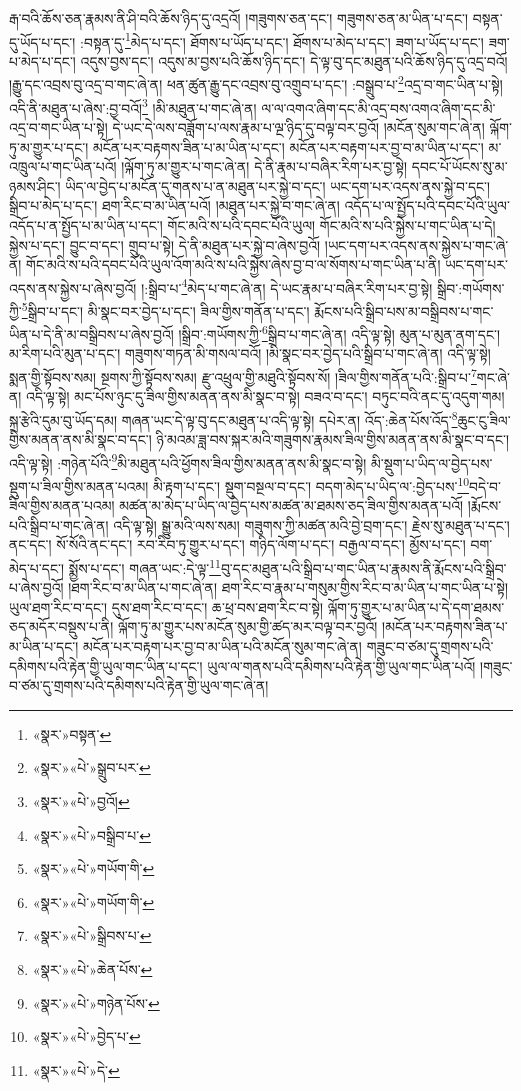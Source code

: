རྒ་བའི་ཆོས་ཅན་རྣམས་ནི་ཤི་བའི་ཆོས་ཉིད་དུ་འདྲའོ། །གཟུགས་ཅན་དང་། གཟུགས་ཅན་མ་ཡིན་པ་དང་། བསྟན་དུ་ཡོད་པ་དང་། :བསྟན་དུ་\footnote{«སྣར་»བསྟན་}མེད་པ་དང་། ཐོགས་པ་ཡོད་པ་དང་། ཐོགས་པ་མེད་པ་དང་། ཟག་པ་ཡོད་པ་དང་། ཟག་པ་མེད་པ་དང་། འདུས་བྱས་དང་། འདུས་མ་བྱས་པའི་ཆོས་ཉིད་དང་། དེ་ལྟ་བུ་དང་མཐུན་པའི་ཆོས་ཉིད་དུ་འདྲ་བའོ། །རྒྱུ་དང་འབྲས་བུ་འདྲ་བ་གང་ཞེ་ན། ཕན་ཚུན་རྒྱུ་དང་འབྲས་བུ་འགྲུབ་པ་དང་། :བསྒྲུབ་པ་\footnote{«སྣར་»«པེ་»སྒྲུབ་པར་}འདྲ་བ་གང་ཡིན་པ་སྟེ། འདི་ནི་མཐུན་པ་ཞེས་:བྱ་བའོ།\footnote{«སྣར་»«པེ་»བྱའོ།} །མི་མཐུན་པ་གང་ཞེ་ན། ལ་ལ་འགའ་ཞིག་དང་མི་འདྲ་བས་འགའ་ཞིག་དང་མི་འདྲ་བ་གང་ཡིན་པ་སྟེ། དེ་ཡང་དེ་ལས་བཟློག་པ་ལས་རྣམ་པ་ལྔ་ཉིད་དུ་བལྟ་བར་བྱའོ། །མངོན་སུམ་གང་ཞེ་ན། ལྐོག་ཏུ་མ་གྱུར་པ་དང་། མངོན་པར་བརྟགས་ཟིན་པ་མ་ཡིན་པ་དང་། མངོན་པར་བརྟག་པར་བྱ་བ་མ་ཡིན་པ་དང་། མ་འཁྲུལ་པ་གང་ཡིན་པའོ། །ལྐོག་ཏུ་མ་གྱུར་པ་གང་ཞེ་ན། དེ་ནི་རྣམ་པ་བཞིར་རིག་པར་བྱ་སྟེ། དབང་པོ་ཡོངས་སུ་མ་ཉམས་ཤིང་། ཡིད་ལ་བྱེད་པ་མངོན་དུ་གནས་པ་ན་མཐུན་པར་སྐྱེ་བ་དང་། ཡང་དག་པར་འདས་ནས་སྐྱེ་བ་དང་། སྒྲིབ་པ་མེད་པ་དང་། ཐག་རིང་བ་མ་ཡིན་པའོ། །མཐུན་པར་སྐྱེ་བ་གང་ཞེ་ན། འདོད་པ་ལ་སྤྱོད་པའི་དབང་པོའི་ཡུལ་འདོད་པ་ན་སྤྱོད་པ་མ་ཡིན་པ་དང་། གོང་མའི་ས་པའི་དབང་པོའི་ཡུལ། གོང་མའི་ས་པའི་སྐྱེས་པ་གང་ཡིན་པ་དེ། སྐྱེས་པ་དང་། བྱུང་བ་དང་། གྲུབ་པ་སྟེ། དེ་ནི་མཐུན་པར་སྐྱེ་བ་ཞེས་བྱའོ། །ཡང་དག་པར་འདས་ནས་སྐྱེས་པ་གང་ཞེ་ན། གོང་མའི་ས་པའི་དབང་པོའི་ཡུལ་འོག་མའི་ས་པའི་སྐྱེས་ཞེས་བྱ་བ་ལ་སོགས་པ་གང་ཡིན་པ་ནི། ཡང་དག་པར་འདས་ནས་སྐྱེས་པ་ཞེས་བྱའོ། །:སྒྲིབ་པ་\footnote{«སྣར་»«པེ་»བསྒྲིབ་པ་}མེད་པ་གང་ཞེ་ན། དེ་ཡང་རྣམ་པ་བཞིར་རིག་པར་བྱ་སྟེ། སྒྲིབ་:གཡོགས་ཀྱི་\footnote{«སྣར་»«པེ་»གཡོག་གི་}སྒྲིབ་པ་དང་། མི་སྣང་བར་བྱེད་པ་དང་། ཟིལ་གྱིས་གནོན་པ་དང་། རྨོངས་པའི་སྒྲིབ་པས་མ་བསྒྲིབས་པ་གང་ཡིན་པ་དེ་ནི་མ་བསྒྲིབས་པ་ཞེས་བྱའོ། །སྒྲིབ་:གཡོགས་ཀྱི་\footnote{«སྣར་»«པེ་»གཡོག་གི་}སྒྲིབ་པ་གང་ཞེ་ན། འདི་ལྟ་སྟེ། མུན་པ་མུན་ནག་དང་། མ་རིག་པའི་མུན་པ་དང་། གཟུགས་གཏན་མི་གསལ་བའོ། །མི་སྣང་བར་བྱེད་པའི་སྒྲིབ་པ་གང་ཞེ་ན། འདི་ལྟ་སྟེ། སྨན་གྱི་སྟོབས་སམ། སྔགས་ཀྱི་སྟོབས་སམ། རྫུ་འཕྲུལ་གྱི་མཐུའི་སྟོབས་སོ། །ཟིལ་གྱིས་གནོན་པའི་:སྒྲིབ་པ་\footnote{«སྣར་»«པེ་»སྒྲིབས་པ་}གང་ཞེ་ན། འདི་ལྟ་སྟེ། མང་པོས་ཉུང་དུ་ཟིལ་གྱིས་མནན་ནས་མི་སྣང་བ་སྟེ། བཟའ་བ་དང་། བཏུང་བའི་ནང་དུ་འདུག་གམ། སྐྲ་རྩེའི་དུམ་བུ་ཡོད་དམ། གཞན་ཡང་དེ་ལྟ་བུ་དང་མཐུན་པ་འདི་ལྟ་སྟེ། དཔེར་ན། འོད་:ཆེན་པོས་འོད་\footnote{«སྣར་»«པེ་»ཆེན་པོས་}ཆུང་ངུ་ཟིལ་གྱིས་མནན་ནས་མི་སྣང་བ་དང་། ཉི་མའམ་ཟླ་བས་སྐར་མའི་གཟུགས་རྣམས་ཟིལ་གྱིས་མནན་ནས་མི་སྣང་བ་དང་། འདི་ལྟ་སྟེ། :གཉེན་པོའི་\footnote{«སྣར་»«པེ་»གཉེན་པོས་}མི་མཐུན་པའི་ཕྱོགས་ཟིལ་གྱིས་མནན་ནས་མི་སྣང་བ་སྟེ། མི་སྡུག་པ་ཡིད་ལ་བྱེད་པས་སྡུག་པ་ཟིལ་གྱིས་མནན་པའམ། མི་རྟག་པ་དང་། སྡུག་བསྔལ་བ་དང་། བདག་མེད་པ་ཡིད་ལ་:བྱེད་པས་\footnote{«སྣར་»«པེ་»བྱེད་པ་}བདེ་བ་ཟིལ་གྱིས་མནན་པའམ། མཚན་མ་མེད་པ་ཡིད་ལ་བྱེད་པས་མཚན་མ་ཐམས་ཅད་ཟིལ་གྱིས་མནན་པའོ། །རྨོངས་པའི་སྒྲིབ་པ་གང་ཞེ་ན། འདི་ལྟ་སྟེ། སྒྱུ་མའི་ལས་སམ། གཟུགས་ཀྱི་མཚན་མའི་བྱེ་བྲག་དང་། རྗེས་སུ་མཐུན་པ་དང་། ནང་དང་། སོ་སོའི་ནང་དང་། རབ་རིབ་ཏུ་གྱུར་པ་དང་། གཉིད་ལོག་པ་དང་། བརྒྱལ་བ་དང་། མྱོས་པ་དང་། བག་མེད་པ་དང་། སྨྱོས་པ་དང་། གཞན་ཡང་:དེ་ལྟ་\footnote{«སྣར་»«པེ་»དེ་}བུ་དང་མཐུན་པའི་སྒྲིབ་པ་གང་ཡིན་པ་རྣམས་ནི་རྨོངས་པའི་སྒྲིབ་པ་ཞེས་བྱའོ། །ཐག་རིང་བ་མ་ཡིན་པ་གང་ཞེ་ན། ཐག་རིང་བ་རྣམ་པ་གསུམ་གྱིས་རིང་བ་མ་ཡིན་པ་གང་ཡིན་པ་སྟེ། ཡུལ་ཐག་རིང་བ་དང་། དུས་ཐག་རིང་བ་དང་། ཆ་ཕྲ་བས་ཐག་རིང་བ་སྟེ། ལྐོག་ཏུ་གྱུར་པ་མ་ཡིན་པ་དེ་དག་ཐམས་ཅད་མདོར་བསྡུས་པ་ནི། ལྐོག་ཏུ་མ་གྱུར་པས་མངོན་སུམ་གྱི་ཚད་མར་བལྟ་བར་བྱའོ། །མངོན་པར་བརྟགས་ཟིན་པ་མ་ཡིན་པ་དང་། མངོན་པར་བརྟག་པར་བྱ་བ་མ་ཡིན་པའི་མངོན་སུམ་གང་ཞེ་ན། གཟུང་བ་ཙམ་དུ་གྲགས་པའི་དམིགས་པའི་རྟེན་གྱི་ཡུལ་གང་ཡིན་པ་དང་། ཡུལ་ལ་གནས་པའི་དམིགས་པའི་རྟེན་གྱི་ཡུལ་གང་ཡིན་པའོ། །གཟུང་བ་ཙམ་དུ་གྲགས་པའི་དམིགས་པའི་རྟེན་གྱི་ཡུལ་གང་ཞེ་ན། 